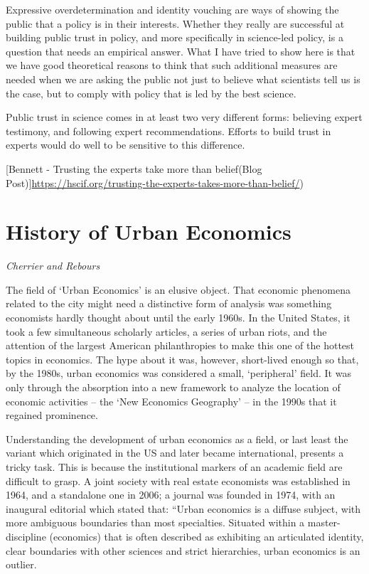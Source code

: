 \documentclass[
]{book}
\begin{document}
Expressive overdetermination and identity vouching are ways of showing the public that a policy is in their interests. Whether they really are successful at building public trust in policy, and more specifically in science-led policy, is a question that needs an empirical answer. What I have tried to show here is that we have good theoretical reasons to think that such additional measures are needed when we are asking the public not just to believe what scientists tell us is the case, but to comply with policy that is led by the best science.

Public trust in science comes in at least two very different forms: believing expert testimony, and following expert recommendations. Efforts to build trust in experts would do well to be sensitive to this difference.

{[}Bennett - Trusting the experts take more than belief(Blog Post){]}\url{https://hscif.org/trusting-the-experts-takes-more-than-belief/})

\hypertarget{history-of-urban-economics}{%
\section{History of Urban Economics}\label{history-of-urban-economics}}

\emph{Cherrier and Rebours}

The field of `Urban Economics' is an elusive object. That economic phenomena related to the city might need a distinctive form of analysis was something economists hardly thought about until the early 1960s. In the United States, it took a few simultaneous scholarly articles, a series of urban riots, and the attention of the largest American philanthropies to make this one of the hottest topics in economics. The hype about it was, however, short-lived enough so­­­ that, by the 1980s, urban economics was considered a small, `peripheral' field. It was only through the absorption into a new framework to analyze the location of economic activities -- the `New Economics Geography' -- in the 1990s that it regained prominence.

Understanding the development of urban economics as a field, or last least the variant which originated in the US and later became international, presents a tricky task. This is because the institutional markers of an academic field are difficult to grasp. A joint society with real estate economists was established in 1964, and a standalone one in 2006; a journal was founded in 1974, with an inaugural editorial which stated that: ``Urban economics is a diffuse subject, with more ambiguous boundaries than most specialties.
Situated within a master-discipline (economics) that is often described as exhibiting an articulated identity, clear boundaries with other sciences and strict hierarchies, urban economics is an outlier.
\end{document}
